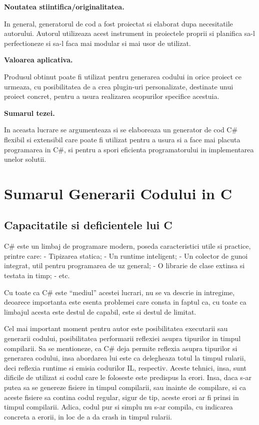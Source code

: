 \documentclass{report}
\begin{document}
\textbf{Noutatea stiintifica/originalitatea.}

In general, generatorul de cod a fost proiectat si elaborat dupa
necesitatile autorului. Autorul utilizeaza acest instrument in
proiectele proprii si planifica sa-l perfectioneze si sa-l faca mai
modular si mai usor de utilizat.

\textbf{Valoarea aplicativa.}

Produsul obtinut poate fi utilizat pentru generarea codului in orice
proiect ce urmeaza, cu posibilitatea de a crea plugin-uri personalizate,
destinate unui proiect concret, pentru a usura realizarea scopurilor
specifice acestuia.

\textbf{Sumarul tezei.}

In aceasta lucrare se argumenteaza si se elaboreaza un generator de cod
C\# flexibil si extensibil care poate fi utilizat pentru a usura si a
face mai placuta programarea in C\#, si pentru a spori eficienta
programatorului in implementarea unelor solutii.


\chapter{Sumarul Generarii Codului in C}

\section{Capacitatile si deficientele lui C}

C\# este un limbaj de programare modern, poseda caracteristici utile si
practice, printre care: - Tipizarea statica; - Un runtime inteligent; -
Un colector de gunoi integrat, util pentru programarea de uz general; -
O librarie de clase extinsa si testata in timp; - etc.

Cu toate ca C\# este ``mediul'' acestei lucrari, nu se va descrie in
intregime, deoarece importanta este esenta problemei care consta in
faptul ca, cu toate ca limbajul acesta este destul de capabil, este si
destul de limitat.

Cel mai important moment pentru autor este posibilitatea executarii sau
generarii codului, posibilitatea performarii reflexiei asupra tipurilor
in timpul compilarii. Sa se mentioneze, ca C\# deja permite reflexia
asupra tipurilor si generarea codului, insa abordarea lui este ca
delegheaza totul la timpul rularii, deci reflexia runtime si emisia
codurilor IL, respectiv. Aceste tehnici, insa, sunt dificile de utilizat
si codul care le foloseste este predispus la erori. Insa, daca s-ar
putea sa se genereze fisiere in timpul compilarii, sau inainte de
compilare, si ca aceste fisiere sa contina codul regular, sigur de tip,
aceste erori ar fi prinsi in timpul compilarii. Adica, codul pur si
simplu nu s-ar compila, cu indicarea concreta a erorii, in loc de a da
crash in timpul rularii.
\end{document}
